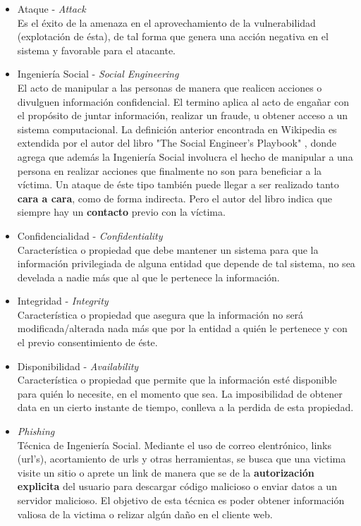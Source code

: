 \begin{itemize}
	\item Ataque - \textit{Attack}
		\\Es el éxito de la amenaza en el aprovechamiento de la vulnerabilidad (explotación de ésta), de tal forma que genera una acción negativa en el sistema y favorable para el atacante.
	\item Ingeniería Social - \textit{Social Engineering}
		\\El acto de manipular a las personas de manera que realicen acciones o divulguen información confidencial. El termino aplica al acto de engañar con el propósito de juntar información, realizar un fraude, u obtener acceso a un sistema computacional. La definición anterior encontrada en Wikipedia es extendida por el autor del libro "The Social Engineer's Playbook" \cite{socEngineeering}, donde agrega que además la Ingeniería Social involucra el hecho de manipular a una persona en realizar acciones que finalmente no son para beneficiar a la víctima. Un ataque de éste tipo también puede llegar a ser realizado tanto \textbf{cara a cara}, como de forma indirecta. Pero el autor del libro indica que siempre hay un \textbf{contacto} previo con la víctima.
	\item Confidencialidad - \textit{Confidentiality} 
		\\Característica o propiedad que debe mantener un sistema para que la información privilegiada de alguna entidad que depende de tal sistema, no sea develada a nadie más que al que le pertenece la información.
	\item Integridad - \textit{Integrity}
		\\Característica o propiedad que asegura que la información no será modificada/alterada nada más que por la entidad a quién le pertenece y con el previo consentimiento de éste.
	\item Disponibilidad - \textit{Availability}
		\\Característica o propiedad que permite que la información esté disponible para quién lo necesite, en el momento que sea. La imposibilidad de obtener data en un cierto instante de tiempo, conlleva a la perdida de esta propiedad.
	\item \textit{Phishing}
		\\Técnica de Ingeniería Social. Mediante el uso de correo elentrónico, links (url's), acortamiento de urls y otras herramientas, se busca que una victima visite un sitio o aprete un link de manera que se de la \textbf{autorización explicita} del usuario para descargar código malicioso o enviar datos a un servidor malicioso. El objetivo de esta técnica es poder obtener información valiosa de la victima o relizar algún daño en el cliente web.

\end{itemize}
